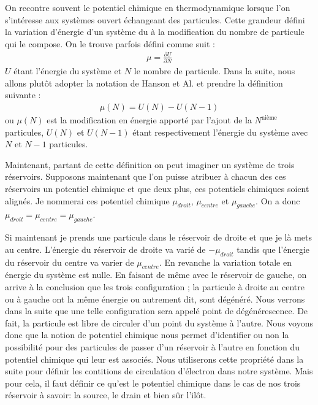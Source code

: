 On recontre souvent le potentiel chimique en thermodynamique lorsque l'on s'intéresse aux systèmes ouvert échangeant des particules. Cette grandeur défini la variation d'énergie d'un système du à la modification du nombre de particule qui le compose. On le trouve parfois défini comme suit :
\begin{eqnarray}
\mu = \frac{\partial U}{\partial N} \nonumber
\end{eqnarray}
$U$ étant l'énergie du système et $N$ le nombre de particule. Dans la suite, nous allons plut\^ot adopter la notation de Hanson et Al. et prendre la définition suivante :
\begin{eqnarray}
\mu(N) = U(N) - U(N-1)
\end{eqnarray}
ou $\mu(N)$ est la modification en énergie apporté par l'ajout de la $N^\text{nième}$ particules, $U(N)$ et $U(N-1)$ étant respectivement l'énergie du système avec $N$ et $N-1$ particules.

Maintenant, partant de cette définition on peut imaginer un système de trois réservoirs. Supposons maintenant que l'on puisse atribuer à chacun des ces réservoirs un potentiel chimique et que deux plus, ces potentiels chimiques soient alignés. Je nommerai ces potentiel chimique $\mu_{droit}$, $\mu_{centre}$ et $\mu_{gauche}$. On a donc $\mu_{droit}=\mu_{centre}=\mu_{gauche}$.

Si maintenant je prends une particule dans le réservoir de droite et que je là mets au centre. L'énergie du réservoir de droite va varié de $-\mu_{droit}$ tandis que l'énergie du réservoir du centre va varier de $\mu_{centre}$. En revanche la variation totale en énergie du système est nulle. En faisant de m\^eme avec le réservoir de gauche, on arrive à la conclusion que les trois configuration ; la particule à droite au centre ou à gauche ont la m\^eme énergie ou autrement dit, sont dégénéré. Nous verrons dans la suite que une telle configuration sera appelé point de dégénérescence. De fait, la particule est libre de circuler d'un point du système à l'autre. Nous voyons donc que la notion de potentiel chimique nous permet d'identifier ou non la possibilité pour des particules de passer d'un réservoir à l'autre en fonction du potentiel chimique qui leur est associés. Nous utiliserons cette propriété dans la suite pour définir les contitions de circulation d'électron dans notre système. Mais pour cela, il faut définir ce qu'est le potentiel chimique dans le cas de nos trois réservoir à savoir: la source, le drain et bien sûr l'ilôt.


